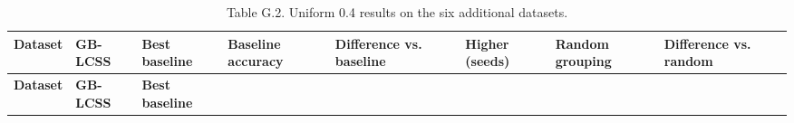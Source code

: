 \begin{longtable}[]{@{}
  >{\raggedright\arraybackslash}p{}
  >{\centering\arraybackslash}p{}
  >{\centering\arraybackslash}p{}
  >{\centering\arraybackslash}p{}
  >{\centering\arraybackslash}p{}
  >{\centering\arraybackslash}p{}
  >{\centering\arraybackslash}p{}
  >{\centering\arraybackslash}p{}@{}}
\caption{Table G.2. Uniform 0.4 results on the six additional datasets.}\tabularnewline
\toprule\noalign{}
\begin{minipage}[b]{\linewidth}\raggedright
\textbf{Dataset}
\end{minipage} & \begin{minipage}[b]{\linewidth}\centering
\textbf{GB-LCSS}
\end{minipage} & \begin{minipage}[b]{\linewidth}\centering
\textbf{Best baseline}
\end{minipage} & \begin{minipage}[b]{\linewidth}\centering
\textbf{Baseline accuracy}
\end{minipage} & \begin{minipage}[b]{\linewidth}\centering
\textbf{Difference vs. baseline}
\end{minipage} & \begin{minipage}[b]{\linewidth}\centering
\textbf{Higher (seeds)}
\end{minipage} & \begin{minipage}[b]{\linewidth}\centering
\textbf{Random grouping}
\end{minipage} & \begin{minipage}[b]{\linewidth}\centering
\textbf{Difference vs. random}
\end{minipage} \\
\midrule\noalign{}
\endfirsthead
\toprule\noalign{}
\begin{minipage}[b]{\linewidth}\raggedright
\textbf{Dataset}
\end{minipage} & \begin{minipage}[b]{\linewidth}\centering
\textbf{GB-LCSS}
\end{minipage} & \begin{minipage}[b]{\linewidth}\centering
\textbf{Best baseline}

\end{minipage}
\end{longtable}
